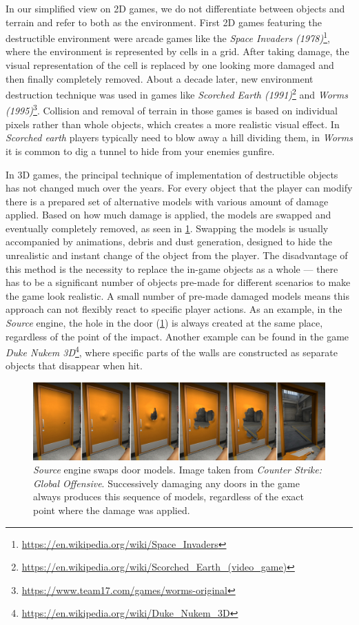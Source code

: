 In our simplified view on 2D games, we do not differentiate between objects and terrain and refer to both as the environment.
First 2D games featuring the destructible environment were arcade games like the \emph{Space Invaders (1978)}\footnote{\url{https://en.wikipedia.org/wiki/Space\_Invaders}}, where the environment is represented by cells in a grid. After taking damage, the visual representation of the cell is replaced by one looking more damaged and then finally completely removed. About a decade later, new environment destruction technique was used in games like \emph{Scorched Earth (1991)}\footnote{\url{https://en.wikipedia.org/wiki/Scorched\_Earth\_(video\_game)}} and \emph{Worms (1995)}\footnote{\url{https://www.team17.com/games/worms-original}}. Collision and removal of terrain in those games is based on individual pixels rather than whole objects, which creates a more realistic visual effect. In \emph{Scorched earth} players typically need to blow away a hill dividing them, in \emph{Worms} it is common to dig a tunnel to hide from your enemies gunfire.

In 3D games, the principal technique of implementation of destructible objects has not changed much over the years. For every object that the player can modify there is a prepared set of alternative models with various amount of damage applied. Based on how much damage is applied, the models are swapped and eventually completely removed, as seen in \cref{fig:doors}. Swapping the models is usually accompanied by animations, debris and dust generation, designed to hide the unrealistic and instant change of the object from the player. The disadvantage of this method is the necessity to replace the in-game objects as a whole --- there has to be a significant number of objects pre-made for different scenarios to make the game look realistic. A small number of pre-made damaged models means this approach can not flexibly react to specific player actions. As an example, in the \emph{Source} engine, the hole in the door (\cref{fig:doors}) is always created at the same place, regardless of the point of the impact. Another example can be found in the game \emph{Duke Nukem 3D}\footnote{\url{https://en.wikipedia.org/wiki/Duke\_Nukem\_3D}}, where specific parts of the walls are constructed as separate objects that disappear when hit.

\begin{figure} 
\centering
\includegraphics[width=\textwidth]{img/doors}
\caption{\emph{Source} engine swaps door models. Image taken from \emph{Counter Strike: Global Offensive}. Successively damaging any doors in the game always produces this sequence of models, regardless of the exact point where the damage was applied.}
\label{fig:doors}
\end{figure}

